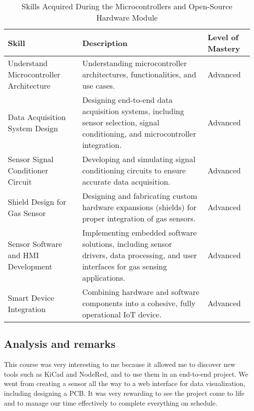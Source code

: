 \begin{table}[H]
    \centering
    \renewcommand{\arraystretch}{1.5} %
    \begin{tabular}{|p{3.5cm}|p{8cm}|p{3.5cm}|}
    \hline
    \rowcolor[gray]{0.8}
    \textbf{Skill} & \textbf{Description} & \textbf{Level of Mastery} \\
    \hline
    Understand Microcontroller Architecture & 
    Understanding microcontroller architectures, functionalities, and use cases. & 
    Advanced \\
    \hline
    Data Acquisition System Design & 
    Designing end-to-end data acquisition systems, including sensor selection, signal conditioning, and microcontroller integration. & 
    Advanced \\
    \hline
    Sensor Signal Conditioner Circuit & 
    Developing and simulating signal conditioning circuits to ensure accurate data acquisition. & 
    Advanced \\
    \hline
    Shield Design for Gas Sensor & 
    Designing and fabricating custom hardware expansions (shields) for proper integration of gas sensors. & 
    Advanced \\
    \hline
    Sensor Software and HMI Development & 
    Implementing embedded software solutions, including sensor drivers, data processing, and user interfaces for gas sensing applications. & 
    Advanced \\
    \hline
    Smart Device Integration & 
    Combining hardware and software components into a cohesive, fully operational IoT device. & 
    Advanced \\
    \hline
    \end{tabular}
    \caption{Skills Acquired During the Microcontrollers and Open-Source Hardware Module}
\end{table}

\subsection{Analysis and remarks}

\indent \indent This course was very interesting to me because it allowed me to discover new tools such as KiCad and NodeRed, and to use them in an end-to-end project. We went from creating a sensor all the way to a web interface for data visualization, including designing a PCB. It was very rewarding to see the project come to life and to manage our time effectively to complete everything on schedule.
\vspace{0.25cm}

